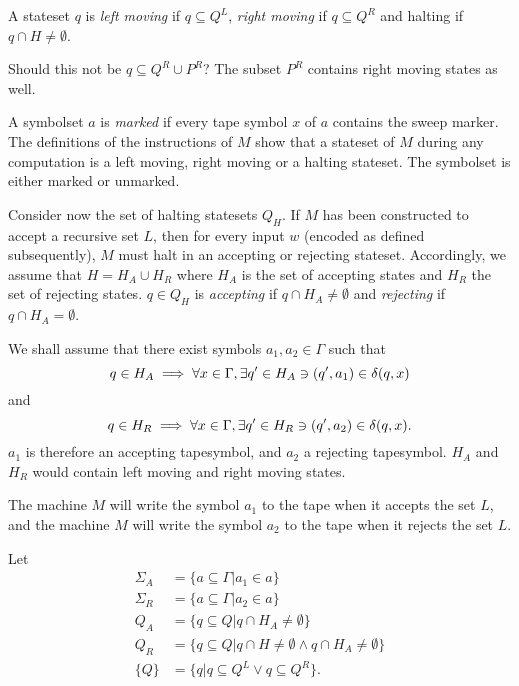A stateset $q$ is \emph{left moving} if $q \subseteq Q^L$, \emph{right moving} if
$q \subseteq Q^R$ and halting if $q \cap H \neq \emptyset$.
\begin{error}
    Should this not be $q \subseteq Q^R \cup P^R$?
    The subset $P^R$ contains right moving states as well.
\end{error}
A symbolset $a$ is \emph{marked} if every tape symbol $x$ of $a$ contains the sweep marker.
The definitions of the instructions of $M$ show that a stateset of $M$ during any
computation is a left moving, right moving or a halting stateset.
The symbolset is either marked or unmarked.

Consider now the set of halting statesets $Q_H$.
If $M$ has been constructed to accept a recursive set $L$, then
for every input $w$ (encoded as defined subsequently), $M$ must halt
in an accepting or rejecting stateset.
Accordingly, we assume that $H = H_A \cup H_R$ where
$H_A$ is the set of accepting states and $H_R$ the set of
rejecting states.
$q \in Q_H$ is \emph{accepting} if $q \cap H_A \neq \emptyset$
and \emph{rejecting} if $q \cap H_A = \emptyset$.

We shall assume that there exist symbols $a_1, a_2 \in \Gamma$ such that
\[
    q \in H_A \implies \forall x \in \Gamma, \exists q' \in H_A \ni
    (q', a_1) \in \delta(q,x)
\]
and
\[
    q \in H_R \implies \forall x \in \Gamma, \exists q' \in H_R \ni
    (q', a_2) \in \delta(q,x).
\]
$a_1$ is therefore an accepting tapesymbol, and $a_2$ a rejecting
tapesymbol.  $H_A$ and $H_R$ would contain left moving and right moving states.

\begin{aside}
    The machine $M$ will write the symbol $a_1$ to the tape when it accepts the set $L$, and
    the machine $M$ will write the symbol $a_2$ to the tape when it rejects the set $L$.
\end{aside}

Let
\begin{align*}
    \Sigma_{A} &= \{a \subseteq \Gamma | a_1 \in a\} \\
    \Sigma_{R} &= \{a \subseteq \Gamma | a_2 \in a\} \\
    Q_A &= \{q \subseteq Q | q \cap H_A \neq \emptyset\} \\
    Q_R &= \{q \subseteq Q | q \cap H \neq \emptyset \land q \cap H_A \neq \emptyset \} \\
    \{Q\} &= \{q | q \subseteq Q^L \lor q \subseteq Q^R \}.
\end{align*}

